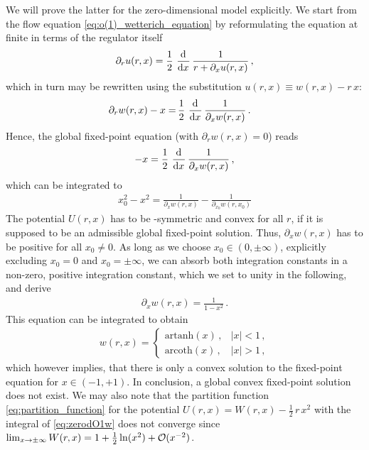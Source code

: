 We will prove the latter for the zero-dimensional  model explicitly.
We start from the \frg{} flow equation \eqref{eq:o(1)_wetterich_equation} by reformulating the equation at finite \rgtime{} in terms of the regulator itself
\begin{align}
	\partial_r u ( r, x ) = \frac{1}{2} \, \dod{}{x} \frac{1}{r + \partial_x u ( r , x )} \, ,
\end{align}
which in turn may be rewritten using the substitution $u ( r, x ) \equiv w ( r, x ) - r \, x$:
\begin{align}
	\partial_r w ( r, x ) - x = \, & \frac{1}{2} \, \dod{}{x} \frac{1}{\partial_x w( r , x )}\, .
\end{align}
Hence, the global fixed-point equation (with $\partial_r w ( r, x )=0$) reads
\begin{align}
	- x = \frac{1}{2} \, \dod{}{x} \frac{1}{\partial_x w ( r , x )}\,,
\end{align}
which can be integrated to
\begin{align}
	x_0^2 - x^2 = \frac{1}{\partial_x w ( r, x )} - \frac{1}{\partial_{x_0} w ( r, x_0 )}
\end{align}
The potential $U ( r, x )$ has to be \ZII{}-symmetric and convex for all $r$, if it is supposed to be an admissible global fixed-point solution.
Thus, $\partial_x w ( r, x )$ has to be positive for all $x_0 \neq 0$. 
As long as we choose $x_0 \in ( 0, \pm \infty )$, explicitly excluding $x_0 = 0$ and $x_0 = \pm \infty$, we can absorb both integration constants in a non-zero, positive integration constant, which we set \wlogA{} to unity in the following, and derive
\begin{align}
	\partial_x w ( r, x ) = \frac{1}{1 - x^2} \, .
\end{align}
This equation can be integrated to obtain
\begin{align}
	w ( r, x ) =
	\begin{cases}
		\mathrm{artanh} ( x ) \, ,	&	|x| < 1 \, ,
		\\
		\mathrm{arcoth} ( x ) \, ,	&	|x| > 1 \, ,
	\end{cases}\label{eq:zerodO1w}
\end{align}
which however implies, that there is only a convex solution to the fixed-point equation for $x \in ( - 1, + 1)$. 
In conclusion, a global convex fixed-point solution does not exist.
We may also note that the partition function \eqref{eq:partition_function} for the potential $U ( r, x ) = W ( r, x ) - \frac{1}{2} \, r \, x^2$ with the integral of \cref{eq:zerodO1w} does not converge since $\lim_{x\rightarrow \pm\infty}W(r,x)=1+\frac{1}{2}\ln(x^2)+\mathcal{O}(x^{-2})$.\bigskip

